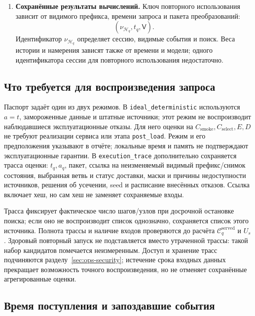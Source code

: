 \documentclass[12pt,a4paper]{article}
\newcommand{\code}[1]{{\ttfamily\small\nolinkurl{#1}}}
\theoremstyle{plainru}
\begin{document}
\begin{enumerate}
\item \textbf{Сохранённые результаты вычислений.}
Ключ повторного использования зависит от видимого префикса,
времени запроса и пакета преобразований:
\[
(\nu_{\mathcal H_q},t_q,\mathsf V).
\]
Идентификатор $\nu_{\mathcal H_q}$ определяет сессию, видимые события
и поиск. Веса истории и намерения зависят также от времени и модели;
одного идентификатора сессии для повторного использования недостаточно.
\end{enumerate}

\subsection{Что требуется для воспроизведения запроса}
\label{sec:ops-replay-trace}

Паспорт задаёт один из двух режимов. В \code{ideal_deterministic}
используются $a=t$, замороженные данные и штатные источники; этот режим
не воспроизводит наблюдавшиеся эксплуатационные отказы.
Для него оценки на $C_{\mathrm{smoke}},C_{\mathrm{select}},E,D$
не требуют реализации сервиса или этапа \code{post_load}.
Режим и его предположения указывают в отчёте; локальные время и память
не подтверждают эксплуатационные гарантии.
В \code{execution_trace} дополнительно сохраняется трасса оценки:
$t_q,a_q$, пакет, ссылка на неизменяемый видимый префикс/снимок состояния,
выбранная ветвь и статус доставки, маски и причины недоступности
источников, решения об усечении, seed и расписание внесённых отказов.
Ссылка включает хеш, но сам хеш не заменяет сохраняемые входы.

Трасса фиксирует фактическое число шагов/узлов при досрочной остановке
поиска; если оно не воспроизводит список однозначно, сохраняется список
этого источника. Полнота трассы и наличие входов проверяются до расчёта
$\mathcal C_q^{\mathrm{served}}$ и $U_s$. Здоровый повторный запуск
не подставляется вместо утраченной трассы: такой набор кандидатов
помечается неизмеренным. Доступ и хранение трасс подчиняются
разделу~\ref{sec:ops-security}; истечение срока входных данных прекращает
возможность точного воспроизведения, но не отменяет сохранённые агрегированные оценки.

\subsection{Время поступления и запоздавшие события}
\label{sec:ops-event-time-validation}
\end{document}
